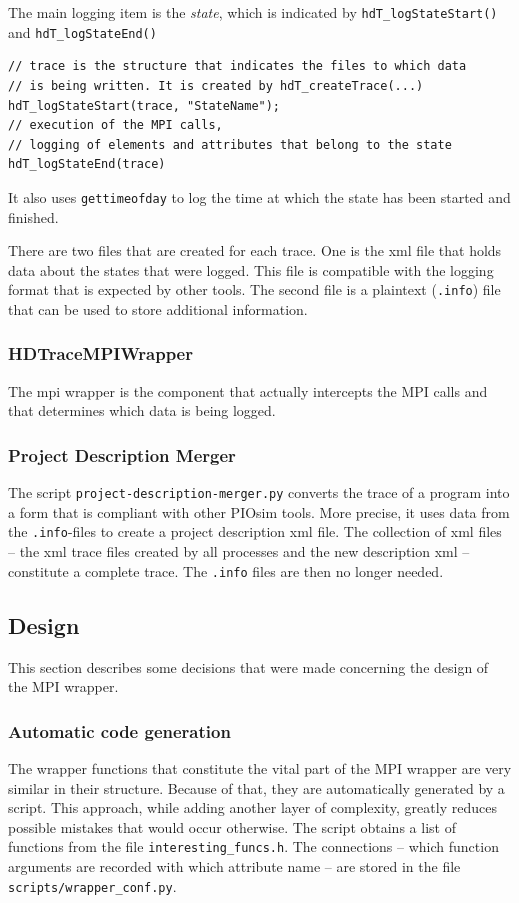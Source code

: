 \documentclass[a4paper,12pt,pdftex]{scrartcl}
\begin{document}
The main logging item is the \emph{state}, which is indicated by
\verb/hdT_logStateStart()/ and \verb/hdT_logStateEnd()/
\begin{lstlisting}
// trace is the structure that indicates the files to which data
// is being written. It is created by hdT_createTrace(...)
hdT_logStateStart(trace, "StateName");
// execution of the MPI calls, 
// logging of elements and attributes that belong to the state
hdT_logStateEnd(trace)
\end{lstlisting}

It also uses \verb/gettimeofday/ to log the time at which the state
has been started and finished.

There are two files that are created for each trace. One is the xml
file that holds data about the states that were logged. This file is
compatible with the logging format that is expected by other
tools. The second file is a plaintext (\verb/.info/) file that can be
used to store additional information.

\subsubsection{HDTraceMPIWrapper}
The mpi wrapper is the component that actually intercepts the MPI
calls and that determines which data is being logged. 

\subsubsection{Project Description Merger}
The script \verb/project-description-merger.py/ converts the trace of
a program into a form that is compliant with other PIOsim tools. More
precise, it uses data from the \verb/.info/-files to create a project
description xml file. The collection of xml files -- the xml trace files
created by all processes and the new description xml -- constitute a complete
trace. The \verb/.info/ files are then no longer needed.

\subsection{Design}
This section describes some decisions that were made
concerning the design of the MPI wrapper.

\subsubsection{Automatic code generation}
The wrapper functions that constitute the vital part of the MPI
wrapper are very similar in their structure. Because of that, they are
automatically generated by a script. This approach, while adding
another layer of complexity, greatly reduces possible mistakes that
would occur otherwise. The script obtains a list of functions from the
file \verb|interesting_funcs.h|. The connections -- which function
arguments are recorded with which attribute name -- are stored in the
file \verb|scripts/wrapper_conf.py|.
\end{document}
